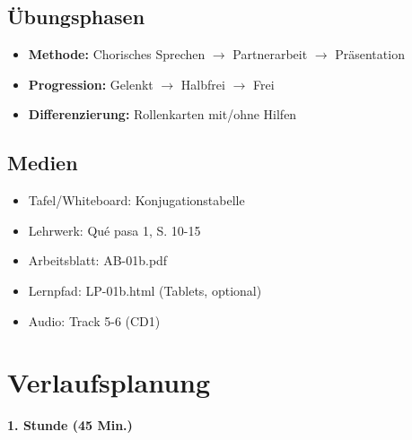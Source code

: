 \documentclass[11pt,a4paper]{article}
\newcommand{\lehrwerk}{Qué pasa 1}
\newcommand{\lehrwerkseite}{S. 10-15}
\begin{document}
\subsection{Übungsphasen}
\begin{itemize}
    \item \textbf{Methode:} Chorisches Sprechen $\rightarrow$ Partnerarbeit $\rightarrow$ Präsentation
    \item \textbf{Progression:} Gelenkt $\rightarrow$ Halbfrei $\rightarrow$ Frei
    \item \textbf{Differenzierung:} Rollenkarten mit/ohne Hilfen
\end{itemize}

\subsection{Medien}
\begin{itemize}
    \item Tafel/Whiteboard: Konjugationstabelle
    \item Lehrwerk: \lehrwerk, \lehrwerkseite
    \item Arbeitsblatt: AB-01b.pdf
    \item Lernpfad: LP-01b.html (Tablets, optional)
    \item Audio: Track 5-6 (CD1)
\end{itemize}

\section{Verlaufsplanung}

\textbf{1. Stunde (45 Min.)}
\end{document}
